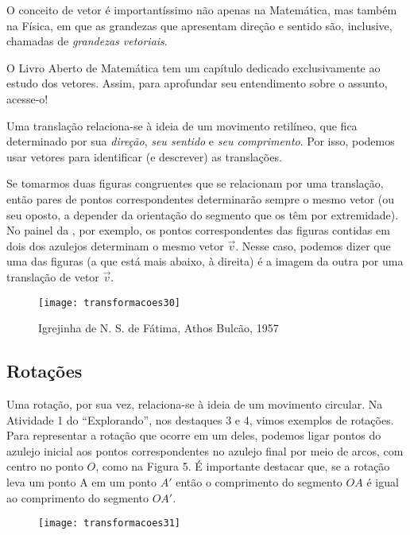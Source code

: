 \begin{knowledge}
O conceito de vetor é importantíssimo não apenas na Matemática, mas também na Física, em que as grandezas que apresentam direção e sentido são, inclusive, chamadas de \textit{grandezas vetoriais}. 

O Livro Aberto de Matemática tem um capítulo dedicado exclusivamente ao estudo dos vetores. Assim, para aprofundar seu entendimento sobre o assunto, acesse-o!
\end{knowledge}

Uma translação relaciona-se à ideia de um movimento retilíneo, que fica determinado por sua \textit{direção}, \textit{seu sentido} e \textit{seu comprimento}. Por isso, podemos usar vetores para identificar (e descrever) as translações. 

Se tomarmos duas figuras congruentes que se relacionam por uma translação, então pares de pontos correspondentes determinarão sempre o mesmo vetor (ou seu oposto, a depender da orientação do segmento que os têm por extremidade). No painel da , por exemplo, os pontos correspondentes das figuras contidas em dois dos azulejos determinam o mesmo vetor $\overrightarrow{v}$. Nesse caso, podemos dizer que uma das figuras (a que está mais abaixo, à direita) é a imagem da outra por uma translação de vetor $\overrightarrow{v}$.

\begin{figure}[H]
\centering

\texttt{[image: transformacoes30]}
\caption{Igrejinha de N. S. de Fátima, Athos Bulcão, 1957}
\label{transformacoes30}
\end{figure}

\subsection{Rotações}


Uma rotação, por sua vez, relaciona-se à ideia de um movimento circular. Na Atividade 1 do “Explorando”, nos destaques 3 e 4, vimos exemplos de rotações. Para representar a rotação que ocorre em um deles, podemos ligar pontos do azulejo inicial aos pontos correspondentes no azulejo final por meio de arcos, com centro no ponto $O$, como na Figura 5. É importante destacar que, se a rotação leva um ponto A em um ponto $A'$ então o comprimento do segmento $OA$ é igual ao comprimento do segmento $OA'$.

\begin{figure}[H]
\centering

\texttt{[image: transformacoes31]}
\caption{}
\label{transformacoes31}
\end{figure}

